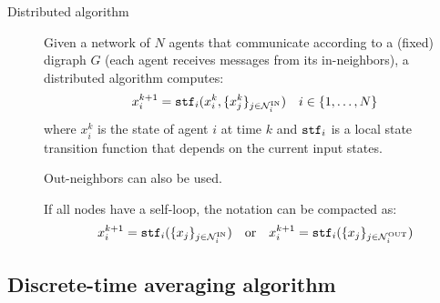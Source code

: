 \begin{description}
    \item[Distributed algorithm] 
        Given a network of $N$ agents that communicate according to a (fixed) digraph $G$ (each agent receives messages from its in-neighbors), a distributed algorithm computes:
        \[ x_i^{k+1} = {\texttt{stf}}_i(x_i^k, \{ x_j^k \}_{j \in \mathcal{N}_i^\text{IN}}) \quad i \in \{ 1, \dots, N \} \]
        where $x_i^k$ is the state of agent $i$ at time $k$ and ${\texttt{stf}}_i$ is a local state transition function that depends on the current input states.

        \begin{remark}
            Out-neighbors can also be used.
        \end{remark}

        \begin{remark}
            If all nodes have a self-loop, the notation can be compacted as:
            \[ 
            x_i^{k+1} = {\texttt{stf}}_i(\{ x_j \}_{j \in \mathcal{N}_i^\text{IN}}) 
            \quad
            \text{or}
            \quad
            x_i^{k+1} = {\texttt{stf}}_i(\{ x_j \}_{j \in \mathcal{N}_i^\text{OUT}})
            \]
        \end{remark}
\end{description}


\subsection{Discrete-time averaging algorithm}

